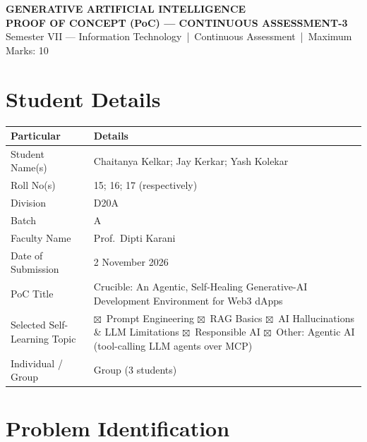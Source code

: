 \documentclass[11pt,letterpaper]{article}
\newcommand{\cbxx}{$\boxtimes$}
\begin{document}
\begin{center}
  {\bfseries\large GENERATIVE ARTIFICIAL INTELLIGENCE}\\[10pt]
  {\bfseries\large PROOF OF CONCEPT (PoC) --- CONTINUOUS ASSESSMENT-3}\\[8pt]
  {\small Semester VII --- Information Technology \,|\, Continuous Assessment \,|\, Maximum Marks: 10}
\end{center}

\section{Student Details}
\begin{tabular}{|L{2.7in}|L{3.45in}|}
\hline
\textbf{Particular} & \textbf{Details}\\\hline
Student Name(s) & Chaitanya Kelkar; Jay Kerkar; Yash Kolekar\\\hline
Roll No(s) & 15; 16; 17 (respectively)\\\hline
Division & D20A\\\hline
Batch & A\\\hline
Faculty Name & Prof.\ Dipti Karani\\\hline
Date of Submission & 2 November 2026\\\hline
PoC Title & Crucible: An Agentic, Self-Healing Generative-AI Development Environment for Web3 dApps\\\hline
Selected Self-Learning Topic &
  \cbxx\ Prompt Engineering \quad \cbxx\ RAG Basics \quad
  \cbxx\ AI Hallucinations \& LLM Limitations \quad \cbxx\ Responsible AI \quad
  \cbxx\ Other: Agentic AI (tool-calling LLM agents over MCP)\\\hline
Individual / Group & Group (3 students)\\\hline
\end{tabular}

\section{Problem Identification}
\end{document}
